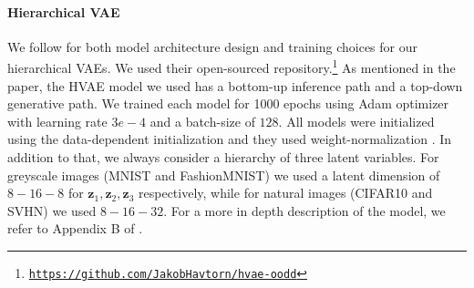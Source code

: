 {\paragraph{Hierarchical VAE} We follow \parencite{havtorn_hierarchical_2021} for both model architecture design and training choices for our hierarchical VAEs. We used their open-sourced repository.\footnote{\href{https://github.com/JakobHavtorn/hvae-oodd}{\texttt{https://github.com/JakobHavtorn/hvae-oodd}}} As mentioned in the paper, the HVAE model we used has a bottom-up inference path and a top-down generative path. We trained each model for 1000 epochs using Adam optimizer with learning rate $3e-4$ and a batch-size of $128$. All models were initialized using the data-dependent initialization and they used weight-normalization \parencite{salimans_weight_2016}. In addition to that, we always consider a hierarchy of three latent variables. For greyscale images (MNIST and FashionMNIST) we used a latent dimension of $8-16-8$ for $\mathbf{z}_1, \mathbf{z}_2, \mathbf{z}_3$ respectively, while for natural images (CIFAR10 and SVHN) we used $8-16-32$. For a more in depth description of the model, we refer to Appendix B of \textcite{havtorn_hierarchical_2021}.


\begin{table}[tb]
    \caption{Test log-likelihood (bits/dim) on MNIST, FashionMNIST, SVHN, and CIFAR10 achieved by the models used in the paper.}
    \label{tab_modelagnostic:log_like}
    \begin{subtable}{0.48\textwidth}
        \centering
        \scriptsize
\end{subtable}
\end{table}}

